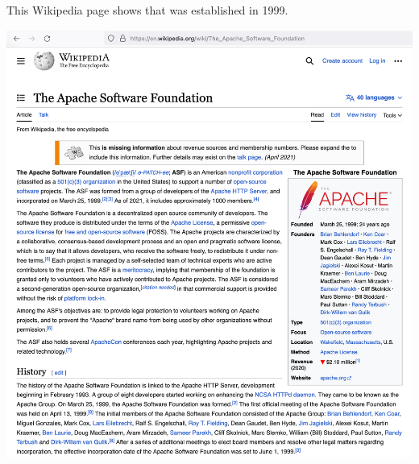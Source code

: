 
This Wikipedia page shows that \Asf was established in 1999.

\includegraphics[width=\textwidth]{wikipedia}

\pagebreak
